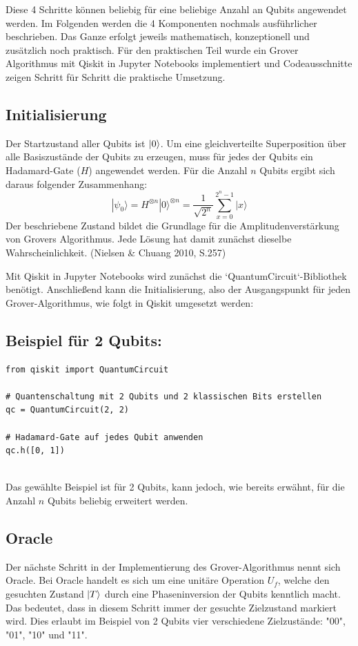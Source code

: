 Diese 4 Schritte können beliebig für eine beliebige Anzahl an Qubits angewendet werden. Im Folgenden werden die 4 Komponenten nochmals ausführlicher beschrieben. Das Ganze erfolgt jeweils mathematisch, konzeptionell und zusätzlich noch praktisch. Für den praktischen Teil wurde ein Grover Algorithmus mit Qiskit in Jupyter Notebooks implementiert und Codeausschnitte zeigen Schritt für Schritt die praktische Umsetzung.

\subsection*{Initialisierung}
Der Startzustand aller Qubits ist $\ket{0}$. Um eine gleichverteilte Superposition über alle Basiszustände der Qubits zu erzeugen, muss für jedes der Qubits ein Hadamard-Gate ($H$) angewendet werden. Für die Anzahl $n$ Qubits ergibt sich daraus folgender Zusammenhang:
$$
|\psi_0\rangle = H^{\otimes n}|0\rangle^{\otimes n} = \frac{1}{\sqrt{2^n}} \sum_{x=0}^{2^n-1} |x\rangle
$$
Der beschriebene Zustand bildet die Grundlage für die Amplitudenverstärkung von Grovers Algorithmus. Jede Lösung hat damit zunächst dieselbe Wahrscheinlichkeit. (Nielsen \& Chuang 2010, S.257)

Mit Qiskit in Jupyter Notebooks wird zunächst die `QuantumCircuit`-Bibliothek benötigt. Anschließend kann die Initialisierung, also der Ausgangspunkt für jeden Grover-Algorithmus, wie folgt in Qiskit umgesetzt werden:
\subsection*{Beispiel für 2 Qubits:}
\begin{verbatim}
from qiskit import QuantumCircuit

# Quantenschaltung mit 2 Qubits und 2 klassischen Bits erstellen
qc = QuantumCircuit(2, 2)

# Hadamard-Gate auf jedes Qubit anwenden
qc.h([0, 1])


\end{verbatim}
Das gewählte Beispiel ist für 2 Qubits, kann jedoch, wie bereits erwähnt, für die Anzahl $n$ Qubits beliebig erweitert werden.

\subsection*{Oracle}
Der nächste Schritt in der Implementierung des Grover-Algorithmus nennt sich Oracle. Bei Oracle handelt es sich um eine unitäre Operation $U_f$, welche den gesuchten Zustand $\ket{T}$ durch eine Phaseninversion der Qubits kenntlich macht. Das bedeutet, dass in diesem Schritt immer der gesuchte Zielzustand markiert wird. Dies erlaubt im Beispiel von 2 Qubits vier verschiedene Zielzustände: "00", "01", "10" und "11".

